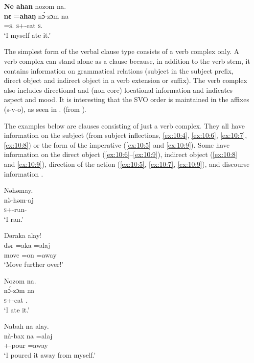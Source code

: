 \ea \label{ex:10:3}
\textbf{Ne  ahan}  nozom  na.\\
\gll  \textbf{nɛ} \textbf{=ahaŋ}     n\'{ɔ}-zɔm    na\\
      {\oneS}  =\textsc{s}.{\POSS}  \textsc{s}+{\PFV}-eat  \textsc{s}.{\DO}\\
\glt  ‘I myself ate it.’
\z

The simplest form of the verbal clause type consists of a verb complex only. A verb complex can stand alone as a clause because, in addition to the verb stem, it contains information on grammatical relations (subject in the subject prefix, direct object and indirect object in a verb extension or suffix). The verb complex also includes directional and (non-core) locational information and indicates aspect and mood. It is interesting that the SVO order is maintained in the affixes (s-v-o), as seen in . (from ).

The examples below are clauses consisting of just a verb complex. They all have information on the subject (from subject inflections, \ref{ex:10:4}, \ref{ex:10:6}, \ref{ex:10:7}, \ref{ex:10:8}) or the form of the imperative (\ref{ex:10:5} and \ref{ex:10:9}). Some have information on the direct object (\ref{ex:10:6}--\ref{ex:10:9}), indirect object (\ref{ex:10:8} and \ref{ex:10:9}), direction of the action (\ref{ex:10:5}, \ref{ex:10:7}, \ref{ex:10:9}), and discourse information .  

\ea \label{ex:10:4}
Nəhəmay.\\
\gll  n\`{ə}-həm-aj\\
      \textsc{s}+{\PFV}-run-\CL\\
\glt  ‘I ran.’
\z

\ea \label{ex:10:5}
Dəraka  alay!\\
\gll  dər    =aka  =alaj\\
      move  =on  =away\\
\glt  ‘Move further over!’
\z

\ea \label{ex:10:6}
\glll Nozom  na.\\
      n\'{ɔ}-zɔm    na\\
      \textsc{s}+{\PFV}-eat    \SSS.\DO\\
\glt  ‘I ate it.’
\z

\ea \label{ex:10:7}
Nabah  na  alay. \\
\gll  nà-bax     na   =alaj \\
      {\oneS}+{\PFV}-pour {\DO}  =away\\
\glt  ‘I poured it away from myself.’
\z


